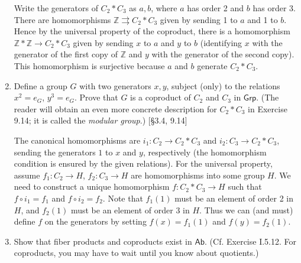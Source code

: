 \begin{enumerate}
            \begin{solution}
                  Write the generators of $C_2 \ast C_3$ as $a, b$, where $a$ has order 2 and $b$ has order 3. There are homomorphisms $\mathbb{Z} \rightrightarrows C_2 \ast C_3$ given by sending 1 to $a$ and 1 to $b$. Hence by the universal property of the coproduct, there is a homomorphism $\mathbb{Z} \ast \mathbb{Z} \to C_2 \ast C_3$ given by sending $x$ to $a$ and $y$ to $b$ (identifying $x$ with the generator of the first copy of $\mathbb{Z}$ and $y$ with the generator of the second copy). This homomorphism is surjective because $a$ and $b$ generate $C_2 \ast C_3$.
            \end{solution}

      \item Define a group $G$ with two generators $x, y$, subject (only) to the relations $x^2 = e_G$, $y^3 = e_G$. Prove that $G$ is a coproduct of $C_2$ and $C_3$ in $\mathsf{Grp}$. (The reader will obtain an even more concrete description for $C_2 \ast C_3$ in Exercise 9.14; it is called the \textit{modular group}.) [\S3.4, 9.14]
      
      \begin{solution}
            The canonical homomorphisms are $i_1:C_2 \to C_2 \ast C_3$ and $i_2:C_3 \to C_2 \ast C_3$, sending the generators $1$ to $x$ and $y$, respectively (the homomorphism condition is ensured by the given relations). For the universal property, assume $f_1:C_2 \to H$, $f_2:C_3 \to H$ are homomorphisms into some group $H$. We need to construct a unique homomorphism $f:C_2 \ast C_3 \to H$ such that $f \circ i_1 = f_1$ and $f \circ i_2 = f_2$. Note that $f_1(1)$ must be an element of order 2 in $H$, and $f_2(1)$ must be an element of order 3 in $H$. Thus we can (and must) define $f$ on the generators by setting $f(x) = f_1(1)$ and $f(y) = f_2(1)$.
      \end{solution}

      \item Show that fiber products and coproducts exist in $\mathsf{Ab}$. (Cf. Exercise I.5.12. For coproducts, you may have to wait until you know about quotients.)
\end{enumerate}